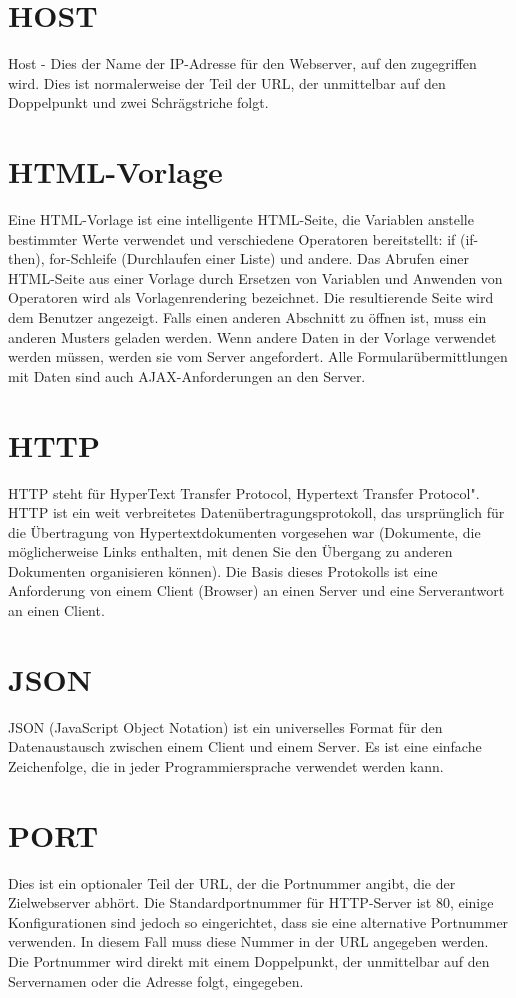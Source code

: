 \section*{HOST}
\label{sec:appendix:host}
Host - Dies  der Name der IP-Adresse für den Webserver, auf den zugegriffen wird. Dies ist normalerweise der Teil der URL, der unmittelbar auf den Doppelpunkt und zwei Schrägstriche folgt.\cite[p.31]{shklar:webapplication} 

\section*{HTML-Vorlage}
\label{sec:appendix:html}
Eine HTML-Vorlage ist eine intelligente HTML-Seite, die Variablen anstelle bestimmter Werte verwendet und verschiedene Operatoren bereitstellt: if (if-then), for-Schleife (Durchlaufen einer Liste) und andere. Das Abrufen einer HTML-Seite aus einer Vorlage durch Ersetzen von Variablen und Anwenden von Operatoren wird als Vorlagenrendering bezeichnet. Die resultierende Seite wird dem Benutzer angezeigt. Falls einen anderen Abschnitt zu öffnen ist, muss ein anderen Musters geladen werden. Wenn andere Daten in der Vorlage verwendet werden müssen, werden sie vom Server angefordert. Alle Formularübermittlungen mit Daten sind auch AJAX-Anforderungen an den Server.

\section*{HTTP}
\label{sec:appendix:http}
HTTP steht für HyperText Transfer Protocol, Hypertext Transfer Protocol". HTTP ist ein weit verbreitetes Datenübertragungsprotokoll, das ursprünglich für die Übertragung von Hypertextdokumenten vorgesehen war (Dokumente, die möglicherweise Links enthalten, mit denen Sie den Übergang zu anderen Dokumenten organisieren können). Die Basis dieses Protokolls ist eine Anforderung von einem Client (Browser) an einen Server und eine Serverantwort an einen Client.

\section*{JSON}
\label{sec:appendix:json}
JSON (JavaScript Object Notation) ist ein universelles Format für den Datenaustausch zwischen einem Client und einem Server. Es ist eine einfache Zeichenfolge, die in jeder Programmiersprache verwendet werden kann.

\section*{PORT} 
\label{sec:appendix:port}
Dies ist ein optionaler Teil der URL, der die Portnummer angibt, die der Zielwebserver abhört. Die Standardportnummer für HTTP-Server ist 80, einige Konfigurationen sind jedoch so eingerichtet, dass sie eine alternative Portnummer verwenden. In diesem Fall muss diese Nummer in der URL angegeben werden. Die Portnummer wird direkt mit einem Doppelpunkt, der unmittelbar auf den Servernamen oder die Adresse folgt, eingegeben.\cite[p.31]{shklar:webapplication} 

